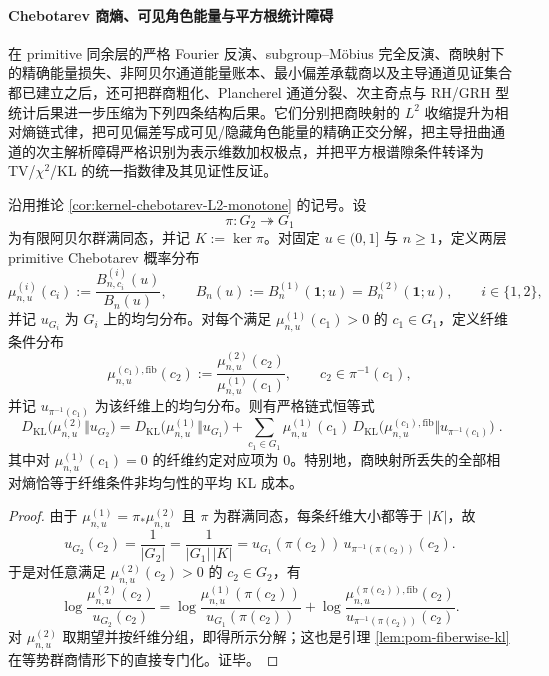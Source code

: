 \paragraph{Chebotarev 商熵、可见角色能量与平方根统计障碍}
在 primitive 同余层的严格 Fourier 反演、subgroup--Möbius 完全反演、商映射下的精确能量损失、非阿贝尔通道能量账本、最小偏差承载商以及主导通道见证集合都已建立之后，还可把群商粗化、Plancherel 通道分裂、次主奇点与 RH/GRH 型统计后果进一步压缩为下列四条结构后果。它们分别把商映射的 \(L^2\) 收缩提升为相对熵链式律，把可见偏差写成可见/隐藏角色能量的精确正交分解，把主导扭曲通道的次主解析障碍严格识别为表示维数加权极点，并把平方根谱隙条件转译为 TV/\(\chi^2\)/KL 的统一指数律及其见证性反证。

\begin{theorem}\label{thm:xi-time-part64ac-abelian-quotient-kl-chain}
沿用推论 \ref{cor:kernel-chebotarev-L2-monotone} 的记号。设
\[
\pi:G_2\twoheadrightarrow G_1
\]
为有限阿贝尔群满同态，并记 \(K:=\ker\pi\)。对固定 \(u\in(0,1]\) 与 \(n\ge 1\)，定义两层 primitive Chebotarev 概率分布
\[
\mu_{n,u}^{(i)}(c_i):=\frac{B_{n,c_i}^{(i)}(u)}{B_n(u)},
\qquad
B_n(u):=B_n^{(1)}(\mathbf{1};u)=B_n^{(2)}(\mathbf{1};u),
\qquad
i\in\{1,2\},
\]
并记 \(u_{G_i}\) 为 \(G_i\) 上的均匀分布。对每个满足 \(\mu_{n,u}^{(1)}(c_1)>0\) 的 \(c_1\in G_1\)，定义纤维条件分布
\[
\mu_{n,u}^{(c_1),\mathrm{fib}}(c_2)
:=
\frac{\mu_{n,u}^{(2)}(c_2)}{\mu_{n,u}^{(1)}(c_1)},
\qquad
c_2\in \pi^{-1}(c_1),
\]
并记 \(u_{\pi^{-1}(c_1)}\) 为该纤维上的均匀分布。则有严格链式恒等式
\[
\boxed{\;
D_{\mathrm{KL}}\!\bigl(\mu_{n,u}^{(2)}\Vert u_{G_2}\bigr)
=
D_{\mathrm{KL}}\!\bigl(\mu_{n,u}^{(1)}\Vert u_{G_1}\bigr)
+
\sum_{c_1\in G_1}\mu_{n,u}^{(1)}(c_1)\,
D_{\mathrm{KL}}\!\bigl(\mu_{n,u}^{(c_1),\mathrm{fib}}\Vert u_{\pi^{-1}(c_1)}\bigr)\; }.
\]
其中对 \(\mu_{n,u}^{(1)}(c_1)=0\) 的纤维约定对应项为 \(0\)。特别地，商映射所丢失的全部相对熵恰等于纤维条件非均匀性的平均 KL 成本。
\end{theorem}
\begin{proof}
由于 \(\mu_{n,u}^{(1)}=\pi_\ast\mu_{n,u}^{(2)}\) 且 \(\pi\) 为群满同态，每条纤维大小都等于 \(|K|\)，故
\[
u_{G_2}(c_2)
=
\frac{1}{|G_2|}
=
\frac{1}{|G_1|\,|K|}
=
u_{G_1}(\pi(c_2))\,u_{\pi^{-1}(\pi(c_2))}(c_2).
\]
于是对任意满足 \(\mu_{n,u}^{(2)}(c_2)>0\) 的 \(c_2\in G_2\)，有
\[
\log\frac{\mu_{n,u}^{(2)}(c_2)}{u_{G_2}(c_2)}
=
\log\frac{\mu_{n,u}^{(1)}(\pi(c_2))}{u_{G_1}(\pi(c_2))}
+
\log\frac{\mu_{n,u}^{(\pi(c_2)),\mathrm{fib}}(c_2)}{u_{\pi^{-1}(\pi(c_2))}(c_2)}.
\]
对 \(\mu_{n,u}^{(2)}\) 取期望并按纤维分组，即得所示分解；这也是引理 \ref{lem:pom-fiberwise-kl} 在等势群商情形下的直接专门化。证毕。
\end{proof}

